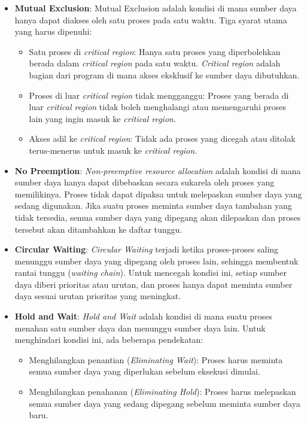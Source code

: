 \documentclass[12pt]{article}
\begin{document}
\begin{itemize}
    \item \textbf{Mutual Exclusion}:
    Mutual Exclusion adalah kondisi di mana sumber daya hanya dapat diakses oleh satu proses pada satu waktu. Tiga syarat utama yang harus dipenuhi:
    \begin{itemize}
        \item Satu proses di \textit{critical region}: Hanya satu proses yang diperbolehkan berada dalam \textit{critical region} pada satu waktu. \textit{Critical region} adalah bagian dari program di mana akses eksklusif ke sumber daya dibutuhkan.
        \item Proses di luar \textit{critical region} tidak mengganggu: Proses yang berada di luar \textit{critical region} tidak boleh menghalangi atau memengaruhi proses lain yang ingin masuk ke \textit{critical region}.
        \item Akses adil ke \textit{critical region}: Tidak ada proses yang dicegah atau ditolak terus-menerus untuk masuk ke \textit{critical region}.
    \end{itemize}

    \item \textbf{No Preemption}:
    \textit{Non-preemptive resource allocation} adalah kondisi di mana sumber daya hanya dapat dibebaskan secara sukarela oleh proses yang memilikinya. Proses tidak dapat dipaksa untuk melepaskan sumber daya yang sedang digunakan. Jika suatu proses meminta sumber daya tambahan yang tidak tersedia, semua sumber daya yang dipegang akan dilepaskan dan proses tersebut akan ditambahkan ke daftar tunggu.

    \item \textbf{Circular Waiting}:
    \textit{Circular Waiting} terjadi ketika proses-proses saling menunggu sumber daya yang dipegang oleh proses lain, sehingga membentuk rantai tunggu (\textit{waiting chain}). Untuk mencegah kondisi ini, setiap sumber daya diberi prioritas atau urutan, dan proses hanya dapat meminta sumber daya sesuai urutan prioritas yang meningkat.

    \item \textbf{Hold and Wait}:
    \textit{Hold and Wait} adalah kondisi di mana suatu proses menahan satu sumber daya dan menunggu sumber daya lain. Untuk menghindari kondisi ini, ada beberapa pendekatan:
    \begin{itemize}
        \item Menghilangkan penantian (\textit{Eliminating Wait}): Proses harus meminta semua sumber daya yang diperlukan sebelum eksekusi dimulai.
        \item Menghilangkan penahanan (\textit{Eliminating Hold}): Proses harus melepaskan semua sumber daya yang sedang dipegang sebelum meminta sumber daya baru.
    \end{itemize}
\end{itemize}
\end{document}

